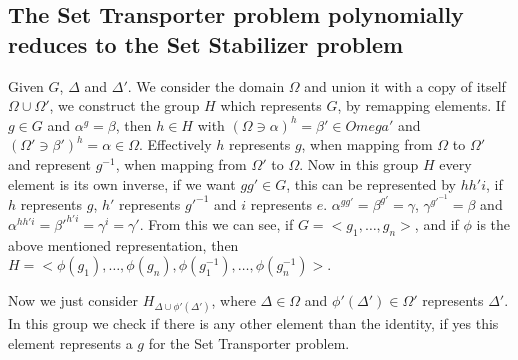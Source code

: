 \subsection{The Set Transporter problem polynomially reduces to the Set Stabilizer problem}

Given $G$, $\Delta$ and $\Delta'$. We consider the domain $\Omega$ and union it with a copy of itself $\Omega \cup \Omega'$, we construct the group $H$ which represents $G$, by remapping elements. If $g \in G$ and $\alpha^g=\beta$, then $h \in H$ with $(\Omega \ni \alpha)^h=\beta' \in Omega'$ and $(\Omega' \ni \beta')^h=\alpha \in \Omega$. Effectively $h$ represents $g$, when mapping from $\Omega$ to $\Omega'$ and represent $g^{-1}$, when mapping from $\Omega'$ to $\Omega$. Now in this group $H$ every element is its own inverse, if we want $gg' \in G$, this can be represented by $h h' i$, if $h$ represents $g$, $h'$ represents $g'^{-1}$ and $i$ represents $e$. $\alpha^{gg'}=\beta^{g'}=\gamma$, $\gamma^{g'^{-1}}=\beta$ and $\alpha^{hh'i}=\beta'^{h'i}=\gamma^{i}=\gamma'$. From this we can see, if $G=<g_1,\dots,g_n>$, and if $\phi$ is the above mentioned representation, then $H=<\phi(g_1),\dots,\phi(g_n),\phi(g_1^{-1}),\dots,\phi(g_n^{-1})>$.

Now we just consider $H_{\Delta\cup\phi'(\Delta')}$, where $\Delta \in \Omega$ and $\phi'(\Delta') \in \Omega'$ represents $\Delta'$. In this group we check if there is any other element than the identity, if yes this element represents a $g$ for the Set Transporter problem.


